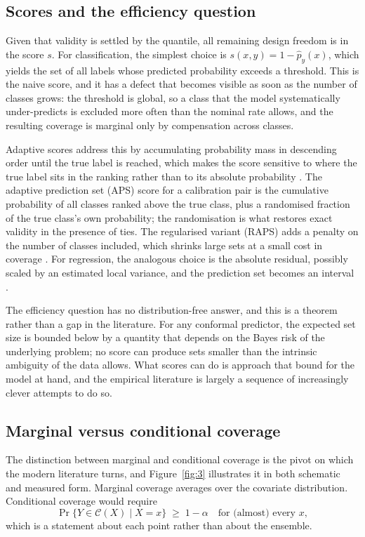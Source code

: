\documentclass[a4paper,longmktitle]{cas-sc}
\begin{document}
\subsection{Scores and the efficiency question}

Given that validity is settled by the quantile, all remaining design freedom is in the score $s$. For classification, the simplest choice is $s(x,y) = 1 - \hat{p}_y(x)$, which yields the set of all labels whose predicted probability exceeds a threshold. This is the naive score, and it has a defect that becomes visible as soon as the number of classes grows: the threshold is global, so a class that the model systematically under-predicts is excluded more often than the nominal rate allows, and the resulting coverage is marginal only by compensation across classes.

Adaptive scores address this by accumulating probability mass in descending order until the true label is reached, which makes the score sensitive to where the true label sits in the ranking rather than to its absolute probability \cite{Romano2020}. The adaptive prediction set (APS) score for a calibration pair is the cumulative probability of all classes ranked above the true class, plus a randomised fraction of the true class's own probability; the randomisation is what restores exact validity in the presence of ties. The regularised variant (RAPS) adds a penalty on the number of classes included, which shrinks large sets at a small cost in coverage \cite{RAPS}. For regression, the analogous choice is the absolute residual, possibly scaled by an estimated local variance, and the prediction set becomes an interval \cite{Lei2018}.

The efficiency question has no distribution-free answer, and this is a theorem rather than a gap in the literature. For any conformal predictor, the expected set size is bounded below by a quantity that depends on the Bayes risk of the underlying problem; no score can produce sets smaller than the intrinsic ambiguity of the data allows. What scores can do is approach that bound for the model at hand, and the empirical literature is largely a sequence of increasingly clever attempts to do so.

\subsection{Marginal versus conditional coverage}

The distinction between marginal and conditional coverage is the pivot on which the modern literature turns, and Figure~\ref{fig:3} illustrates it in both schematic and measured form. Marginal coverage averages over the covariate distribution. Conditional coverage would require
\begin{equation}
\Pr\{Y \in \mathcal{C}(X) \mid X = x\} \;\geq\; 1-\alpha
\quad \text{for (almost) every } x,
\label{eq:cond}
\end{equation}
which is a statement about each point rather than about the ensemble.
\end{document}
